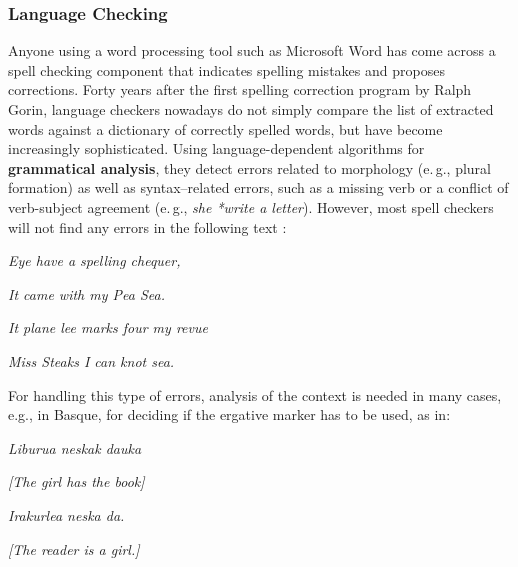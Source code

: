 \begin{multicols}{2}
\subsubsection{Language Checking}
    Anyone using a word processing tool such as Microsoft Word has come across a 
spell checking component that indicates spelling mistakes and proposes corrections. Forty years after the first spelling correction program by Ralph Gorin, language checkers nowadays do not simply compare the list of extracted words against a dictionary of correctly spelled words, but have become increasingly sophisticated. 
Using language-dependent algorithms for \textbf{grammatical analysis}, they detect errors related to morphology (e.\,g., plural formation) as well as syntax–related errors, such as a missing verb or a conflict of verb-subject agreement (e.\,g., \textit{she *write a letter}). However, most spell checkers will not find any errors in the following text \cite{zar1}:
 
\hspace{10pt}\textit{Eye have a spelling chequer,}

\hspace{10pt}\textit{It came with my Pea Sea.}

\hspace{10pt}\textit{It plane lee marks four my revue}

\hspace{10pt}\textit{Miss Steaks I can knot sea.}

For handling this type of errors, analysis of the 
context is needed in many cases, e.g., in Basque, for deciding if the ergative marker has to be used, as in:

\hspace{10pt}\textit{Liburua neskak dauka }

\hspace{10pt}\textit{[The girl has the book]}

\hspace{10pt}\textit{Irakurlea neska da.}

\hspace{10pt}\textit{[The reader is a girl.] }


\end{multicols}
